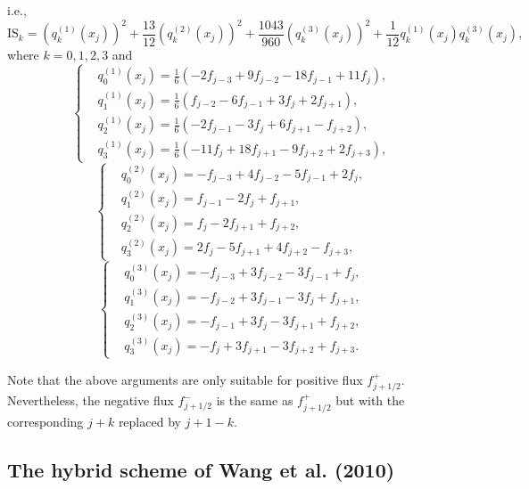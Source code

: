 \documentclass[review]{elsarticle}
\newcommand{\fr}{\frac}
\begin{document}
i.e.,
\begin{equation}
 \mathrm{IS}_k = \left( q_k^{(1)}(x_j) \right)^2 + \fr{13}{12} \left( q_k^{(2)}(x_j) \right)^2 + \fr{1043}{960} \left( q_k^{(3)}(x_j) \right)^2 + \fr{1}{12} q_k^{(1)}(x_j) q_k^{(3)}(x_j),
\end{equation}
where $k=0, 1, 2, 3$ and
\begin{equation}
 \left\{ \begin{split}
 & q_0^{(1)}(x_j) = \fr{1}{6} (-2 f_{j-3} + 9 f_{j-2} - 18 f_{j-1} + 11 f_{j}), \\
 & q_1^{(1)}(x_j) = \fr{1}{6} ( f_{j-2} - 6 f_{j-1} + 3 f_{j} + 2 f_{j+1}), \\
 & q_2^{(1)}(x_j) = \fr{1}{6} (-2 f_{j-1} - 3 f_{j} + 6 f_{j+1} -  f_{j+2}),  \\
 & q_3^{(1)}(x_j) = \fr{1}{6} (-11 f_{j} + 18 f_{j+1} - 9 f_{j+2} + 2 f_{j+3}),
 \end{split} \right.
\end{equation}
\begin{equation}
 \left\{ \begin{split}
  & q_0^{(2)}(x_j) = -f_{j-3} + 4 f_{j-2} - 5 f_{j-1} + 2 f_{j}, \\
  & q_1^{(2)}(x_j) = f_{j-1} - 2f_{j} + f_{j+1}, \\
  & q_2^{(2)}(x_j) = f_{j} - 2f_{j+1} + f_{j+2}, \\
  & q_3^{(2)}(x_j) = 2f_{j} -5 f_{j+1} +4 f_{j+2} - f_{j+3},
 \end{split} \right.
\end{equation}
\begin{equation}
 \left\{ \begin{split}
  & q_0^{(3)}(x_j) = -f_{j-3} + 3 f_{j-2} - 3 f_{j-1} + f_{j}, \\
  & q_1^{(3)}(x_j) = - f_{j-2} + 3 f_{j-1} - 3 f_{j} + f_{j+1}, \\
  & q_2^{(3)}(x_j) = - f_{j-1} + 3 f_{j} - 3 f_{j+1} + f_{j+2},\\
  & q_3^{(3)}(x_j) = -f_{j} + 3 f_{j+1} - 3 f_{j+2} + f_{j+3}.
 \end{split} \right.
\end{equation}

Note that the above arguments are only suitable for positive flux $f^+_{j+1/2}$. Nevertheless, the negative flux $f^-_{j+1/2}$ is the same as $f^+_{j+1/2}$ but with the corresponding $j+k$ replaced by $j+1-k$.


\subsection{The hybrid scheme of Wang et al. (2010)}
\end{document}
